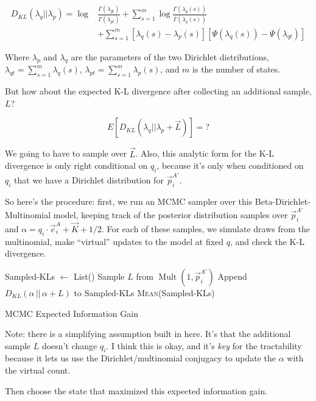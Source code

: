 \documentclass[twocolumn,floatfix,nofootinbib,aps]{revtex4-1}
\begin{document}
\begin{align*}
D_{KL}(\lambda_q || \lambda_p) = \log& \frac{\Gamma(\lambda_{qt})}{\Gamma(\lambda_{pt})} + \sum_{s=1}^m \log \frac{\Gamma(\lambda_p(s))}{\Gamma(\lambda_q(s))} \\
&+ \sum_{s=1}^m \left[\lambda_q(s) -\lambda_p(s)\right]\left[\Psi(\lambda_q(s)) - \Psi(\lambda_{qt})\right]
\end{align*}

Where $\lambda_p$ and $\lambda_q$ are the parameters of the two Dirichlet distributions, $\lambda_{qt} = \sum_{s=1}^{m}\lambda_q(s)$, $\lambda_{pt} = \sum_{s=1}^{m}\lambda_p(s)$, and $m$ is the number of states.

But how about the expected K-L divergence after collecting an additional sample, $L$?

$$
E[D_{KL}(\lambda_q || \lambda_p + \vec{L})] = ?
$$

We going to have to sample over $\vec{L}$. Also, this analytic form for the K-L divergence is only right conditional on $q_i$, because it's only when conditioned on $q_i$ that we have a Dirichlet distribution for $\vec{p}_i^{A'}$.

So here's the procedure: first, we run an MCMC sampler over this Beta-Dirichlet-Multinomial model, keeping track of the posterior distribution samples over $\vec{p}_i^{A'}$ and $\alpha = q_i \cdot \vec{c}_i^A + \vec{K} + 1/2$. For each of these samples, we simulate draws from the multinomial, make ``virtual'' updates to the model at fixed $q$, and check the K-L divergence.\\



\begin{algorithm}[H]
\centering
\begin{algorithmic}[c]
\State Sampled-KLs $\gets$ List()
       \State Sample $L$ from $\operatorname{Mult}(1, \vec{p}_i^{A'})$
       \State Append $D_{KL}(\alpha \,||\, \alpha + L)$ to Sampled-KLs
    \EndFor
\EndFor
\State \Return \textsc{Mean}(Sampled-KLs)
\end{algorithmic}
\caption{MCMC Expected Information Gain}
\end{algorithm}

Note: there is a simplifying assumption built in here. It's that the additional sample $L$ doesn't change $q_i$. I think this is okay, and it's \emph{key} for the tractability because it lets us use the Dirichlet/multinomial conjugacy to update the $\alpha$ with the virtual count.

Then choose the state that maximized this expected information gain.
\end{document}
